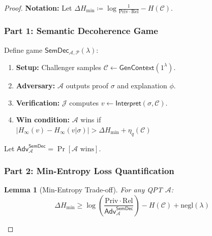 \documentclass[preprint,12pt]{elsarticle}
\newtheorem{lemma}{Lemma}[section]
\newcommand{\negl}{\mathrm{negl}}
\newcommand{\Adv}{\mathsf{Adv}}
\begin{document}
                \begin{proof}\label{pr:cro_impossibility} 
                    \textbf{Notation:} Let $\Delta H_{\text{min}} \coloneqq \log \frac{1}{\mathrm{Priv} \cdot \mathrm{Rel}} - H(\mathcal{C})$. %
                    
                    \subsubsection{Part 1: Semantic Decoherence Game}
                        Define game $\mathsf{SemDec}_{\mathcal{A},\mathcal{P}}(\lambda)$:
                        \begin{enumerate}
                            \item \textbf{Setup:} Challenger samples $\mathcal{C} \gets \mathsf{GenContext}(1^\lambda)$.
                            \item \textbf{Adversary:} $\mathcal{A}$ outputs proof $\sigma$ and explanation $\phi$.
                            \item \textbf{Verification:} $\mathcal{J}$ computes $v \gets \mathsf{Interpret}(\sigma, \mathcal{C})$.
                            \item \textbf{Win condition:} $\mathcal{A}$ wins if \\
                            $\left| H_\infty(v) - H_\infty(v | \sigma) \right| > \Delta H_{\text{min}} + \eta_q(\mathcal{C})$
                        \end{enumerate}
                        Let $\Adv^{\mathsf{SemDec}}_{\mathcal{A}} = \Pr[\mathcal{A} \text{ wins}]$.

                    \subsubsection{Part 2: Min-Entropy Loss Quantification}
                        \begin{lemma}[Min-Entropy Trade-off]\label{lem:min_entropy_tradeoff}
                            For any QPT $\mathcal{A}$:
                            \[
                            \Delta H_{\text{min}} \geq \log \left( \frac{\mathrm{Priv} \cdot \mathrm{Rel}}{\Adv^{\mathsf{SemDec}}_{\mathcal{A}}} \right) - H(\mathcal{C}) + \negl(\lambda)
                            \]
                        \end{lemma}


\end{proof}
\end{document}
